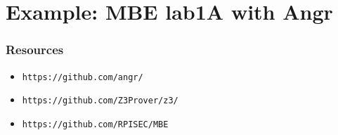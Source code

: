 \documentclass[aspectratio=169]{beamer}
\begin{document}
\section{Example: MBE lab1A with Angr}
\begin{frame}[fragile]
\frametitle{Resources}
\begin{itemize}
\item \verb|https://github.com/angr/|
\item \verb|https://github.com/Z3Prover/z3/|
\item \verb|https://github.com/RPISEC/MBE|
\end{itemize}
\end{frame}
\end{document}
